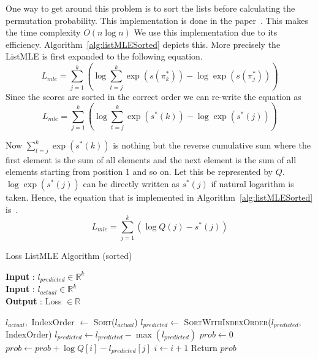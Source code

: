 \documentclass[12pt, twoside, ngerman]{report}
\begin{document}
One way to get around this problem is to sort the lists before calculating the permutation probability.
This implementation is done in the paper~\cite{Pobrotyn2020ContextAwareLT}.
This makes the time complexity $O(n \log n)$
We use this implementation due to its efficiency.
Algorithm~\ref{alg:listMLESorted} depicts this.
More precisely the ListMLE is first expanded to the following equation.
\begin{equation}\label{eq:sortedListMLEequation}
L_{mle} = \sum\limits_{j=1}^{k} \left( \log \sum\limits_{t=j}^k \exp(s(\pi^*_k)) - \log \exp(s(\pi^*_j)) \right)
\end{equation}
Since the scores are sorted in the correct order we can re-write the equation as 
\begin{equation}\label{eq:sortedListMLEequation}
L_{mle} = \sum\limits_{j=1}^{k} \left( \log \sum\limits_{t=j}^k \exp(s^*(k)) - \log \exp(s^*(j)) \right)
\end{equation}

Now $\sum\limits_{t=j}^k \exp(s^*(k))$ is nothing but the reverse cumulative sum where the first element is the sum of all elements and the next element is the sum of all elements starting from position 1 and so on.
Let this be represented by $Q$.
$\log \exp(s^*(j))$ can be directly written as $s^*(j)$ if natural logarithm is taken.
Hence,  the equation that is implemented in Algorithm~\ref{alg:listMLESorted} is~\cite{Pobrotyn2020ContextAwareLT}.
\begin{equation}\label{eq:sortedListMLEequation}
L_{mle} = \sum\limits_{j=1}^{k} \left( \log Q(j) - s^*(j) \right)
\end{equation}

\begin{algorithm}[h]
\caption{Loss ListMLE Algorithm (sorted)}
\label{alg:listMLESorted}
\hspace*{\algorithmicindent} \textbf{Input} : $l_{predicted} \in \mathbb{R}^k$ \\
\hspace*{\algorithmicindent} \textbf{Input} : $l_{actual} \in \mathbb{R}^k$ \\
\hspace*{\algorithmicindent} \textbf{Output} : Loss $\in \mathbb{R}$
\begin{algorithmic}[1]
\State $l_{actual}, $ IndexOrder $\gets$ \textsc{Sort}($l_{actual}$)
\State $l_{predicted} \gets$ \textsc{SortWithIndexOrder}($l_{predicted}$,  IndexOrder)
\State $l_{predicted} \gets l_{predicted} - \max(l_{predicted})$ 
\State $prob \gets 0$    
        \State $prob \gets prob + \log Q[i] - l_{predicted}[j]$
        \State $i \gets i + 1$
    \EndFor
\State Return $prob$
\EndProcedure
\end{algorithmic}
\end{algorithm}
\end{document}
